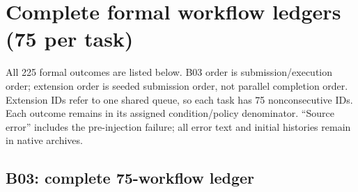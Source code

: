 \documentclass[10pt,letterpaper]{article}
\begin{document}
\clearpage
\section{Complete formal workflow ledgers (75 per task)}\label{app:ledger}
All 225 formal outcomes are listed below. B03 order is submission/execution order; extension order is seeded submission order, not parallel completion order. Extension IDs refer to one shared queue, so each task has 75 nonconsecutive IDs. Each outcome remains in its assigned condition/policy denominator. ``Source error'' includes the pre-injection failure; all error text and initial histories remain in native archives.
\subsection{B03: complete 75-workflow ledger}
\end{document}
